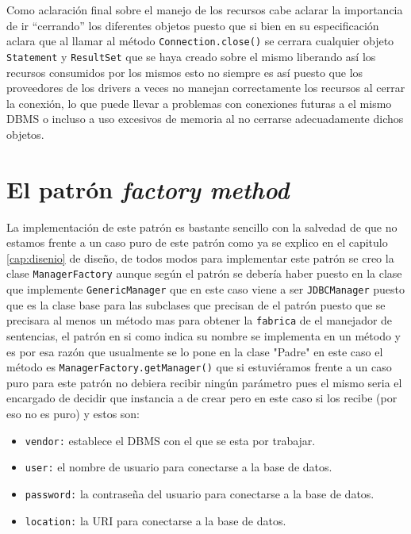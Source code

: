 Como aclaración final sobre el manejo de los recursos cabe aclarar la importancia de ir ``cerrando'' los diferentes objetos puesto que si bien \jd en su especificación aclara que al llamar al método \verb=Connection.close()= se cerrara cualquier objeto \verb=Statement= y \verb=ResultSet= que se haya creado sobre el mismo liberando así los recursos consumidos por los mismos esto no siempre es así puesto que los proveedores de los drivers \jd a veces no manejan correctamente los recursos al cerrar la conexión, lo que puede llevar a problemas con conexiones futuras a el mismo DBMS o incluso a uso excesivos de memoria al no cerrarse adecuadamente dichos objetos.
%
\section{El patrón \textit{factory method}}
La implementación de este patrón es bastante sencillo con la salvedad de que no estamos frente a un caso puro de este patrón como ya se explico en el capitulo \ref{cap:disenio} de diseño, de todos modos para implementar este patrón se creo la clase \verb=ManagerFactory= aunque según el patrón se debería haber puesto en la clase que implemente \verb=GenericManager= que en este caso viene a ser \verb=JDBCManager= puesto que es la clase base para las subclases que precisan de el patrón puesto que se precisara al menos un método mas para obtener la \verb=fabrica= de el manejador de sentencias, el patrón en si como indica su nombre se implementa en un método y es por esa razón que usualmente se lo pone en la clase "Padre" en este caso el método es \verb=ManagerFactory.getManager()= que si estuviéramos frente a un caso puro para este patrón no debiera recibir ningún parámetro pues el mismo seria el encargado de decidir que instancia a  de crear pero en este caso si los recibe (por eso no es puro) y estos son:
\begin{itemize}
\item \verb=vendor:= establece el DBMS con el que se esta por trabajar.
\item \verb=user:= el nombre de usuario para conectarse a la base de datos.
\item \verb=password:= la contraseña del usuario para conectarse a la base de datos.
\item \verb=location:= la URI para conectarse a la base de datos.
\end{itemize}
